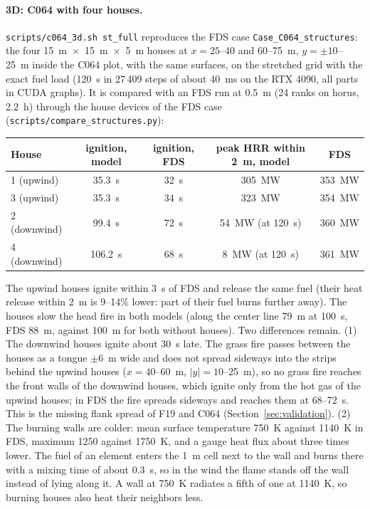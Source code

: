 \documentclass[11pt,a4paper]{article}
\newcommand{\code}[1]{\texttt{#1}}
\begin{document}
\paragraph{3D: C064 with four houses.} \code{scripts/c064\_3d.sh st\_full} reproduces the FDS case
\code{Case\_C064\_structures}: the four 15~m~$\times$~15~m~$\times$~5~m houses at $x=25$--40 and 60--75~m,
$y=\pm10$--25~m inside the C064 plot, with the same surfaces, on the stretched grid with the exact fuel load
(120~s in 27\,409 steps of about 40~ms on the RTX 4090, all parts in CUDA graphs). It is compared with an FDS run at
0.5~m (24 ranks on horus, 2.2~h) through the house devices of the FDS case
(\code{scripts/compare\_structures.py}):
\begin{center}
\small
\begin{tabular}{lcccc}
\toprule
House & ignition, model & ignition, FDS & peak HRR within 2~m, model & FDS \\
\midrule
1 (upwind) & 35.3~s & 32~s & 305~MW & 353~MW \\
3 (upwind) & 35.3~s & 34~s & 323~MW & 354~MW \\
2 (downwind) & 99.4~s & 72~s & 54~MW (at 120~s) & 360~MW \\
4 (downwind) & 106.2~s & 68~s & 8~MW (at 120~s) & 361~MW \\
\bottomrule
\end{tabular}
\end{center}
The upwind houses ignite within 3~s of FDS and release the same fuel (their heat release within 2~m is
9--14\% lower: part of their fuel burns further away). The houses slow the head fire in both models (along
the center line 79~m at 100~s, FDS 88~m, against 100~m for both without houses). Two differences remain.
(1) The downwind houses ignite about 30~s late. The grass fire passes between the houses as a tongue
$\pm6$~m wide and does not spread sideways into the strips behind the upwind houses ($x=40$--60~m,
$|y|=10$--25~m), so no grass fire reaches the front walls of the downwind houses, which ignite only from the
hot gas of the upwind houses; in FDS the fire spreads sideways and reaches them at 68--72~s. This is the
missing flank spread of F19 and C064 (Section~\ref{sec:validation}). (2) The burning walls are colder: mean
surface temperature 750~K against 1140~K in FDS, maximum 1250 against 1750~K, and a gauge heat flux about
three times lower. The fuel of an element enters the 1~m cell next to the wall and burns there with a mixing
time of about 0.3~s, so in the wind the flame stands off the wall instead of lying along it. A wall at 750~K
radiates a fifth of one at 1140~K, so burning houses also heat their neighbors less.
\end{document}
